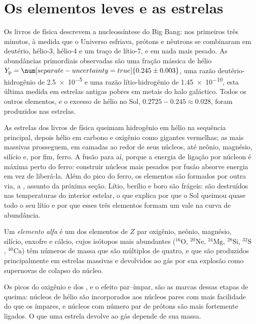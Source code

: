 \section{Os elementos leves e as estrelas}\label{sec:b3:origin-of-elements:stars}

Os livros de física descrevem a nucleossíntese do Big Bang: nos primeiros
três minutos, à medida que o Universo esfriava, prótons e nêutrons se
combinaram em deutério, hélio-3, hélio-4 e um traço de lítio-7, e em nada
mais pesado. As abundâncias primordiais observadas são uma fração mássica
de hélio $Y_\mathrm{p} = \num[separate-uncertainty=true]{0.245 \pm 0.003}$, uma
razão deutério-hidrogênio de \num{2.5e-5} e uma razão lítio-hidrogênio de
\num{1.45e-10}, esta última medida em estrelas antigas pobres em metais do
halo galáctico. Todos os outros elementos, e o excesso de hélio no Sol,
$0.2725 - 0.245 \approx 0.028$, foram produzidos nas estrelas.

As estrelas dos livros de física queimam hidrogênio em hélio na sequência
principal, depois hélio em carbono e oxigênio como gigantes vermelhas; as
mais massivas prosseguem, em camadas ao redor de seus núcleos, até neônio,
magnésio, silício e, por fim, ferro. A fusão para aí, porque a energia de
ligação por núcleon é máxima perto do ferro: construir núcleos mais pesados
por fusão absorve energia em vez de liberá-la. Além do pico do ferro, os
elementos são formados por outra via, a , assunto da
próxima seção. Lítio, berílio e boro são frágeis: são destruídos nas
temperaturas do interior estelar, o que explica por que o Sol queimou
quase todo o seu lítio e por que esses três elementos formam um vale na
curva de abundância.

\begin{definition}\label{def:b3:origin-of-elements:alpha}
Um \emph{elemento alfa} é um dos elementos de $Z$ par
oxigênio, neônio, magnésio, silício, enxofre e cálcio, cujos
isótopos mais abundantes ($^{16}\mathrm{O}$, $^{20}\mathrm{Ne}$,
$^{24}\mathrm{Mg}$, $^{28}\mathrm{Si}$, $^{32}\mathrm{S}$,
$^{40}\mathrm{Ca}$) têm números de massa que são múltiplos de quatro, e
que são produzidos principalmente em estrelas massivas e devolvidos ao gás por sua
explosão como supernovas de colapso do núcleo.
\end{definition}

Os picos do oxigênio e dos , e o efeito par--ímpar,
são as marcas dessas etapas de queima: núcleos de hélio são incorporados aos
núcleos pares com mais facilidade do que os ímpares, e núcleos
com número par de prótons são mais fortemente ligados. O que uma estrela devolve
ao gás depende de sua massa.

